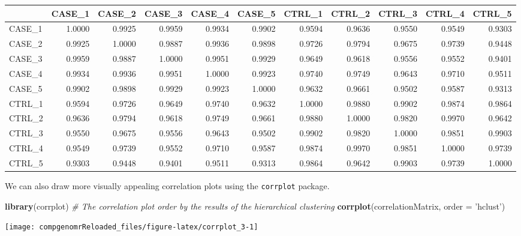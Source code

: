 \documentclass[12pt,]{krantz}
\newenvironment{Shaded}{\begin{snugshade}}{\end{snugshade}}
\newcommand{\CommentTok}[1]{\textcolor[rgb]{0.56,0.35,0.01}{\textit{#1}}}
\newcommand{\DataTypeTok}[1]{\textcolor[rgb]{0.13,0.29,0.53}{#1}}
\newcommand{\KeywordTok}[1]{\textcolor[rgb]{0.13,0.29,0.53}{\textbf{#1}}}
\newcommand{\NormalTok}[1]{#1}
\newcommand{\StringTok}[1]{\textcolor[rgb]{0.31,0.60,0.02}{#1}}
\begin{document}
\begin{tabular}{lrrrrrrrrrr}
\toprule
  & CASE\_1 & CASE\_2 & CASE\_3 & CASE\_4 & CASE\_5 & CTRL\_1 & CTRL\_2 & CTRL\_3 & CTRL\_4 & CTRL\_5\\
\midrule
CASE\_1 & 1.0000 & 0.9925 & 0.9959 & 0.9934 & 0.9902 & 0.9594 & 0.9636 & 0.9550 & 0.9549 & 0.9303\\
CASE\_2 & 0.9925 & 1.0000 & 0.9887 & 0.9936 & 0.9898 & 0.9726 & 0.9794 & 0.9675 & 0.9739 & 0.9448\\
CASE\_3 & 0.9959 & 0.9887 & 1.0000 & 0.9951 & 0.9929 & 0.9649 & 0.9618 & 0.9556 & 0.9552 & 0.9401\\
CASE\_4 & 0.9934 & 0.9936 & 0.9951 & 1.0000 & 0.9923 & 0.9740 & 0.9749 & 0.9643 & 0.9710 & 0.9511\\
CASE\_5 & 0.9902 & 0.9898 & 0.9929 & 0.9923 & 1.0000 & 0.9632 & 0.9661 & 0.9502 & 0.9587 & 0.9313\\
\addlinespace
CTRL\_1 & 0.9594 & 0.9726 & 0.9649 & 0.9740 & 0.9632 & 1.0000 & 0.9880 & 0.9902 & 0.9874 & 0.9864\\
CTRL\_2 & 0.9636 & 0.9794 & 0.9618 & 0.9749 & 0.9661 & 0.9880 & 1.0000 & 0.9820 & 0.9970 & 0.9642\\
CTRL\_3 & 0.9550 & 0.9675 & 0.9556 & 0.9643 & 0.9502 & 0.9902 & 0.9820 & 1.0000 & 0.9851 & 0.9903\\
CTRL\_4 & 0.9549 & 0.9739 & 0.9552 & 0.9710 & 0.9587 & 0.9874 & 0.9970 & 0.9851 & 1.0000 & 0.9739\\
CTRL\_5 & 0.9303 & 0.9448 & 0.9401 & 0.9511 & 0.9313 & 0.9864 & 0.9642 & 0.9903 & 0.9739 & 1.0000\\
\bottomrule
\end{tabular}

We can also draw more visually appealing correlation plots using the \texttt{corrplot} package.

\begin{Shaded}
\begin{Highlighting}[]
\KeywordTok{library}\NormalTok{(corrplot)}
\CommentTok{# The correlation plot order by the results of the hierarchical clustering }
\KeywordTok{corrplot}\NormalTok{(correlationMatrix, }\DataTypeTok{order =} \StringTok{'hclust'}\NormalTok{)}
\end{Highlighting}
\end{Shaded}

\begin{center}\texttt{[image: compgenomrReloaded\_files/figure-latex/corrplot\_3-1]} \end{center}
\end{document}
